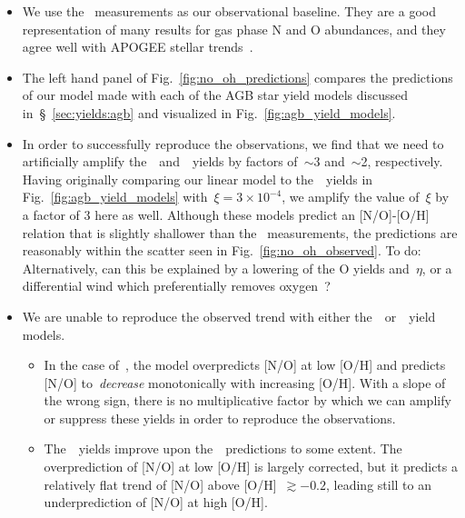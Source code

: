 \documentclass[ms.tex]{subfiles}
\begin{document}
\begin{itemize} 
	\item We use the~\citet{Dopita2016} measurements as our observational 
	baseline. 
	They are a good representation of many results for gas phase N and O 
	abundances, and they agree well with APOGEE stellar 
	trends~\citep{Vincenzo2021}. 

	\item The left hand panel of Fig.~\ref{fig:no_oh_predictions} compares the 
	predictions of our model made with each of the AGB star yield models 
	discussed in~\S~\ref{sec:yields:agb} and visualized in 
	Fig.~\ref{fig:agb_yield_models}. 

	\item In order to successfully reproduce the observations, we find that we 
	need to artificially amplify the~\cristallo~and~\ventura~yields by factors 
	of~$\sim$3 and~$\sim$2, respectively. 
	Having originally comparing our linear model to the~\cristallo~yields in 
	Fig.~\ref{fig:agb_yield_models} with~$\xi = 3\times10^{-4}$, we amplify the 
	value of~$\xi$ by a factor of 3 here as well. 
	Although these models predict an [N/O]-[O/H] relation that is slightly 
	shallower than the~\citet{Dopita2016} measurements, the predictions are 
	reasonably within the scatter seen in Fig.~\ref{fig:no_oh_observed}. 
	{\color{red} To do: Alternatively, can this be explained by a lowering of 
	the O yields and~$\eta$, or a differential wind which preferentially 
	removes oxygen~\citep{Vincenzo2016a}}? 

	\item We are unable to reproduce the observed trend with either 
	the~\karakasten~or~\karakas~yield models. 
	\begin{itemize} 
		\item In the case of~\karakasten, the model overpredicts [N/O] at low 
		[O/H] and predicts [N/O] to~\textit{decrease} monotonically with 
		increasing [O/H]. 
		With a slope of the wrong sign, there is no multiplicative factor by 
		which we can amplify or suppress these yields in order to reproduce the 
		observations. 

		\item The~\karakas~yields improve upon the~\karakasten~predictions to 
		some extent. 
		The overprediction of [N/O] at low [O/H] is largely corrected, but it 
		predicts a relatively flat trend of [N/O] above [O/H]~$\gtrsim -0.2$, 
		leading still to an underprediction of [N/O] at high [O/H]. 
	\end{itemize} 


\end{itemize}
\end{document}
